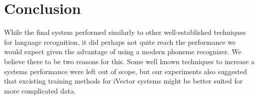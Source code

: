 
\chapter{Conclusion}


While the final system performed similarly to other well-established techniques for language recognition, it did perhaps not quite reach the performance we would expect given the advantage of using a modern phoneme recognizer. We believe there to be two reasons for this. Some well known techniques to increase a systems performance were left out of scope, but our experiments also suggested that excisting training methods for iVector systems might be better suited for more complicated data. 














